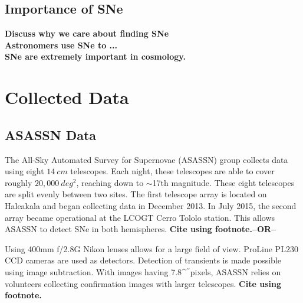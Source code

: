 \documentclass[aps,prb,twocolumn,superscriptaddress]{revtex4-1}
\def\arcsec{\ifmmode^{\prime\prime}\else$^{\prime\prime}$\fi}
\begin{document}
\subsection{Importance of SNe}
{\bf \noindent Discuss why we care about finding SNe\\
\indent Astronomers use SNe to ...\\
\indent SNe are extremely important in cosmology.}



\section{Collected Data}

\subsection{ASASSN Data}

\indent The All-Sky Automated Survey for Supernovae (ASASSN) group 
collects data using eight $14~cm$ telescopes. Each night, these  
telescopes are able to cover roughly $20,000~deg^{2}$, reaching 
down to $\sim$17th magnitude.
These eight telescopes are split evenly between two sites.
The first telescope array is located on Haleakala and began 
collecting data in December 2013. In July 2015, the second %
array became operational at the LCOGT Cerro Tololo station. 
This allows ASASSN to detect SNe in both hemispheres.
{\bf Cite using footnote.--OR--~\cite{asn_data}}

\indent Using 400mm f/2.8G Nikon lenses allows for a large field of 
view. ProLine PL230 CCD cameras are used as detectors. Detection of 
transients is made possible using image subtraction. With images 
having 7.8\arcsec pixels, ASASSN relies on volunteers collecting  
confirmation images with larger telescopes.
{\bf Cite using footnote.}
\end{document}

